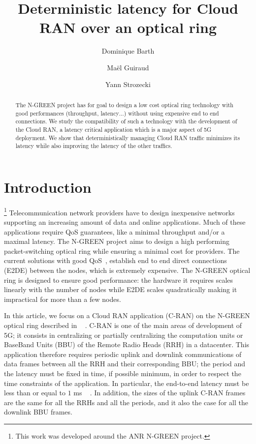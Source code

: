 \documentclass[10pt, conference, letterpaper]{IEEEtran}
\title{Deterministic latency for Cloud RAN over an optical ring}
\author[1]{Dominique Barth}
\author[1,2]{Ma\"el Guiraud}
\author[1]{Yann Strozecki}
\affil[1]{David Laboratory, UVSQ}
\affil[2]{Nokia Bell Labs France}
\begin{document}
\maketitle


\begin{abstract}
The N-GREEN project has for goal to design a low cost optical ring technology with good performances (throughput, latency$\dots$) without using expensive end to end connections. We study the compatibility of such a technology with the development of the Cloud RAN, a latency critical application which is a major aspect of 5G deployment. We show that deterministically managing Cloud RAN traffic minimizes its latency while also improving the latency of the other traffics.

\end{abstract}


\section{Introduction}

\footnote{This work was developed around the ANR N-GREEN project.}  Telecommunication network providers have to design inexpensive networks supporting an increasing amount of data and online applications. Much of these applications require QoS guarantees, like a minimal throughput and/or  a maximal latency. The N-GREEN project aims to design a high performing packet-switching optical ring while ensuring a minimal cost for providers. The current solutions with good QoS~\cite{pizzinat2015things,tayq2017real}, establish end to end direct connections (E2DE) between the nodes, which is extremely expensive. The N-GREEN optical ring is designed to ensure good performance: the hardware it requires scales linearly with the number of nodes while E2DE scales quadratically making it impractical for more than a few nodes.


In this article, we focus on a Cloud RAN application (C-RAN) on the N-GREEN optical ring described in ~ \cite{ngreenarchitecture, uscumlicscalable}. C-RAN is one of the main areas of development of 5G; it consists in centralizing or partially centralizing the computation units or BaseBand Units (BBU) of the Remote Radio Heads (RRH) in a datacenter. This application therefore requires periodic uplink and downlink communications of data frames between  all the  RRH and their corresponding BBU; the period and the latency must be fixed in time, if possible  minimum, in order to respect the time constraints of the application. In particular, the end-to-end latency must be less than or equal to $ 1 $ ms ~ \cite{3gpp5g, boccardi2014five}. In addition, the sizes of the uplink C-RAN frames are the same for all the RRHs and all the periods, and it also the case for all the downlink BBU frames.\\
\end{document}
